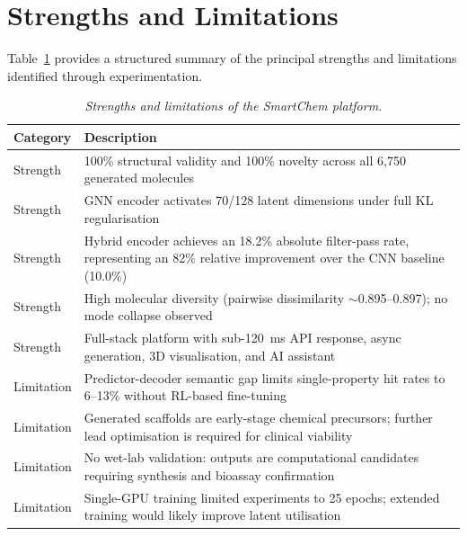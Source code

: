 \documentclass[12pt,a4paper]{report}
\begin{document}
\bigskip

\section{Strengths and Limitations}

Table~\ref{tab:strengths_limitations} provides a structured summary of the principal strengths and limitations identified through experimentation.

\begin{table}[htbp]
\centering
\caption{\textit{Strengths and limitations of the SmartChem platform.}}
\label{tab:strengths_limitations}
\begin{tabular}{lp{11.5cm}}
\hline
\textbf{Category} & \textbf{Description} \\
\hline
Strength & 100\% structural validity and 100\% novelty across all 6{,}750 generated molecules \\
Strength & GNN encoder activates 70/128 latent dimensions under full KL regularisation \\
Strength & Hybrid encoder achieves an 18.2\% absolute filter-pass rate, representing an 82\% relative improvement over the CNN baseline (10.0\%) \\
Strength & High molecular diversity (pairwise dissimilarity $\sim$0.895--0.897); no mode collapse observed \\
Strength & Full-stack platform with sub-120~ms API response, async generation, 3D visualisation, and AI assistant \\
\hline
Limitation & Predictor-decoder semantic gap limits single-property hit rates to 6--13\% without RL-based fine-tuning \\
Limitation & Generated scaffolds are early-stage chemical precursors; further lead optimisation is required for clinical viability \\
Limitation & No wet-lab validation: outputs are computational candidates requiring synthesis and bioassay confirmation \\
Limitation & Single-GPU training limited experiments to 25 epochs; extended training would likely improve latent utilisation \\
\hline
\end{tabular}
\end{table}

\bigskip
\newpage
\end{document}
